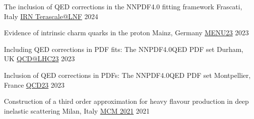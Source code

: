\begin{cvhonors}

    \cvhonor
    {The inclusion of QED corrections in the NNPDF4.0 fitting framework} %
    {Frascati, Italy}
    {\href{https://indico.in2p3.fr/event/31806/contributions/136024/}{IRN Terascale@LNF}} %
    {2024}

    \cvhonor
    {Evidence of intrinsic charm quarks in the proton} %
    {Mainz, Germany}
    {\href{https://indico.him.uni-mainz.de/event/171/contributions/1438/}{MENU23}} %
    {2023}

    \cvhonor
    {Including QED corrections in PDF fits: The NNPDF4.0QED PDF set} %
    {Durham, UK}
    {\href{https://conference.ippp.dur.ac.uk/event/1128/contributions/6473/}{QCD@LHC23}} %
    {2023}

    \cvhonor
    {Inclusion of QED corrections in PDFs: The NNPDF4.0QED PDF set} %
    {Montpellier, France}
    {\href{https://qcd23.sciencesconf.org/}{QCD23}} %
    {2023}

    \cvhonor
    {Construction of a third order approximation for heavy flavour production in deep inelastic scattering} %
    {Milan, Italy}
    {\vspace{0.35cm}\href{https://indico.cern.ch/event/1095418/contributions/4656984/}{MCM 2021}} %
    {\vspace{0.35cm}2021}
    
    


\end{cvhonors}